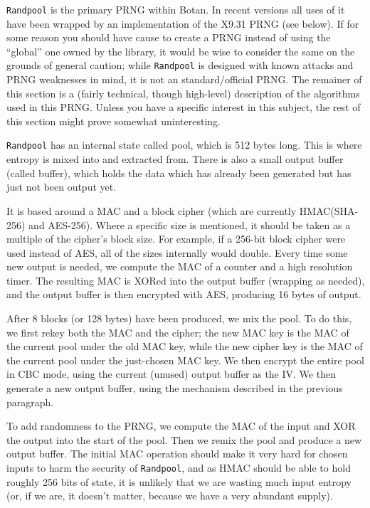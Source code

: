 \documentclass{article}
\newcommand{\type}[1]{\texttt{#1}}
\begin{document}
\type{Randpool} is the primary PRNG within Botan. In recent versions all uses
of it have been wrapped by an implementation of the X9.31 PRNG (see below). If
for some reason you should have cause to create a PRNG instead of using the
``global'' one owned by the library, it would be wise to consider the same on
the grounds of general caution; while \type{Randpool} is designed with known
attacks and PRNG weaknesses in mind, it is not an standard/official PRNG. The
remainer of this section is a (fairly technical, though high-level) description
of the algorithms used in this PRNG. Unless you have a specific interest in
this subject, the rest of this section might prove somewhat uninteresting.

\type{Randpool} has an internal state called pool, which is 512 bytes
long. This is where entropy is mixed into and extracted from. There is also a
small output buffer (called buffer), which holds the data which has already
been generated but has just not been output yet.

It is based around a MAC and a block cipher (which are currently HMAC(SHA-256)
and AES-256). Where a specific size is mentioned, it should be taken as a
multiple of the cipher's block size. For example, if a 256-bit block cipher
were used instead of AES, all of the sizes internally would double. Every time
some new output is needed, we compute the MAC of a counter and a high
resolution timer. The resulting MAC is XORed into the output buffer (wrapping
as needed), and the output buffer is then encrypted with AES, producing 16
bytes of output.

After 8 blocks (or 128 bytes) have been produced, we mix the pool. To do this,
we first rekey both the MAC and the cipher; the new MAC key is the MAC of the
current pool under the old MAC key, while the new cipher key is the MAC of the
current pool under the just-chosen MAC key. We then encrypt the entire pool in
CBC mode, using the current (unused) output buffer as the IV. We then generate
a new output buffer, using the mechanism described in the previous paragraph.

To add randomness to the PRNG, we compute the MAC of the input and XOR the
output into the start of the pool. Then we remix the pool and produce a new
output buffer. The initial MAC operation should make it very hard for chosen
inputs to harm the security of \type{Randpool}, and as HMAC should be able to
hold roughly 256 bits of state, it is unlikely that we are wasting much input
entropy (or, if we are, it doesn't matter, because we have a very abundant
supply).
\end{document}

